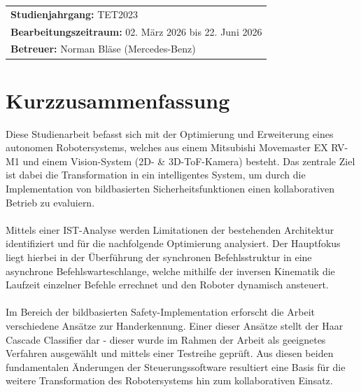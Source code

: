 \documentclass[12pt,a4paper]{report}
\newcommand{\jahrgang}{TET2023}
\newcommand{\bearbeitungszeitraum}{02. März 2026 bis 22. Juni 2026}
\newcommand{\betreuer}{Norman Bläse (Mercedes-Benz)}
\begin{document}
\begin{titlepage}
\begin{table}[b!]
\begin{tabularx}{\textwidth}{lXX}
			\multicolumn{3}{l}{\textbf{Studienjahrgang:} \jahrgang} \\
			\multicolumn{3}{l}{\textbf{Bearbeitungszeitraum:} \bearbeitungszeitraum} \\
			\multicolumn{3}{l}{\textbf{Betreuer:} \betreuer} \\
		\end{tabularx}
	\end{table}
	\renewcommand{\arraystretch}{\stretchbuffer} %
\end{titlepage}

\setcounter{page}{1}


\section*{Kurzzusammenfassung}
Diese Studienarbeit befasst sich mit der Optimierung und Erweiterung eines autonomen Robotersystems, welches aus einem Mitsubishi Movemaster EX RV-M1 und einem Vision-System (2D- \& 3D-ToF-Kamera) besteht. Das zentrale Ziel ist dabei die Transformation in ein intelligentes System, um durch die Implementation von bildbasierten Sicherheitsfunktionen einen kollaborativen Betrieb zu evaluiern.\\
\\Mittels einer IST-Analyse werden Limitationen der bestehenden Architektur identifiziert und für die nachfolgende Optimierung analysiert. Der Hauptfokus liegt hierbei in der Überführung der synchronen Befehlsstruktur in eine asynchrone Befehlswarteschlange, welche mithilfe der inversen Kinematik die Laufzeit einzelner Befehle errechnet und den Roboter dynamisch ansteuert.\\
\\Im Bereich der bildbasierten Safety-Implementation erforscht die Arbeit verschiedene Ansätze zur Handerkennung. Einer dieser Ansätze stellt der Haar Cascade Classifier dar - dieser wurde im Rahmen der Arbeit als geeignetes Verfahren ausgewählt und mittels einer Testreihe geprüft. Aus diesen beiden fundamentalen Änderungen der Steuerungssoftware resultiert eine Basis für die weitere Transformation des Robotersystems hin zum kollaborativen Einsatz.
\newpage
\end{document}
